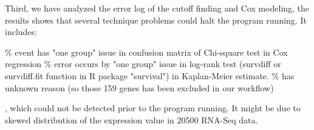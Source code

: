 \documentclass[preprint,12pt]{elsarticle}
\newenvironment{MyColorPar}[1]{%
    \leavevmode\color{#1}\ignorespaces%
}{%
}%
\begin{document}
\begin{MyColorPar}{blue}
\begin{MyColorPar}{red}
Third, we have analyzed the error log of the cutoff finding and Cox modeling, 
the results shows that several technique problems could halt the program running.
It includes:
\begin{outline}

\% event has "one group" issue in confusion matrix of Chi-square test in Cox regression
\% error occurs by "one group" issue in log-rank test (survdiff or survdiff.fit function in R package "survival") in Kaplan-Meier estimate.
\% has unknown reason (so those 159 genes has been excluded in our workflow)
\end{outline}
, which could not be detected prior to the program running.
It might be due to skewed distribution of the expression value in 20500 RNA-Seq  data. %



\end{MyColorPar} %


\end{MyColorPar} %
\end{document}
